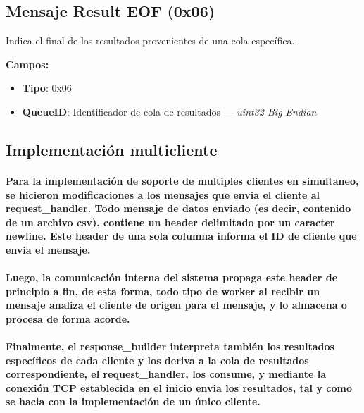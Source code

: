 \documentclass[titlepage,a4paper]{article}
\begin{document}
\subsection{Mensaje Result EOF (0x06)}

Indica el final de los resultados provenientes de una cola específica.

\textbf{Campos:}
\begin{itemize}
	\item \textbf{Tipo}: 0x06
	\item \textbf{QueueID}: Identificador de cola de resultados — \textit{uint32 Big Endian}
\end{itemize}

\subsection{Implementación multicliente}

\paragraph{Para la implementación de soporte de multiples clientes en simultaneo, se hicieron modificaciones a los mensajes que envia el cliente al request\_handler. Todo mensaje de datos enviado (es decir, contenido de un archivo csv), contiene un header delimitado por un caracter newline. Este header de una sola columna informa el ID de cliente que envia el mensaje.}

\paragraph{Luego, la comunicación interna del sistema propaga este header de principio a fin, de esta forma, todo tipo de worker al recibir un mensaje analiza el cliente de origen para el mensaje, y lo almacena o procesa de forma acorde.}

\paragraph{Finalmente, el response\_builder interpreta también los resultados específicos de cada cliente y los deriva a la cola de resultados correspondiente, el request\_handler, los consume, y mediante la conexión TCP establecida en el inicio envia los resultados, tal y como se hacia con la implementación de un único cliente.}
\end{document}
